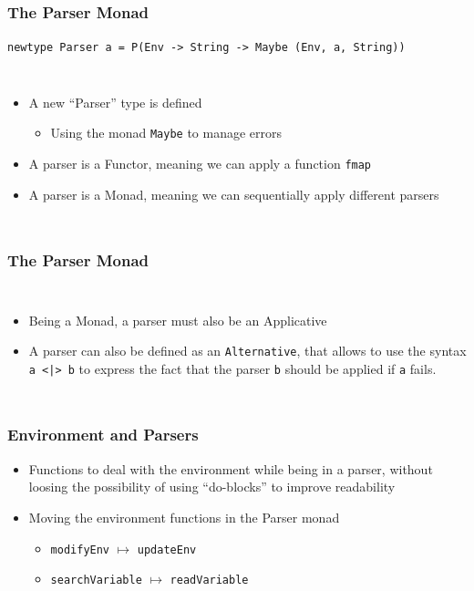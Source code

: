\documentclass{beamer}
\begin{document}
\begin{frame}
	\frametitle{The Parser Monad}
	\begin{center}
		\lstinline{newtype Parser a = P(Env -> String -> Maybe (Env, a, String))}
	\end{center}
	\begin{columns}
		\footnotesize
		\begin{itemize}
			\item A new ``Parser'' type is defined
				\begin{itemize}
					\footnotesize
					\item Using the monad \lstinline|Maybe| to manage errors
				\end{itemize}
			\item A parser is a Functor, meaning we can apply a function
				\texttt{fmap}
			\item A parser is a Monad, meaning we can sequentially apply
				different parsers
		\end{itemize}
		
		
	\end{columns}
\end{frame}

\begin{frame}
	\frametitle{The Parser Monad}
	\begin{columns}
		\column{0.3\textwidth}
		\footnotesize
		\begin{itemize}
			\item Being a Monad, a parser must also be an Applicative
			\item A parser can also be defined as an \texttt{Alternative}, that
				allows to use the syntax \lstinline{a <|> b} to express the
				fact that the parser \texttt{b} should be applied if \texttt{a}
				fails.
		\end{itemize}
		\column{0.65\textwidth}
		
		
	\end{columns}
\end{frame}

\begin{frame}
	\frametitle{Environment and Parsers}
	\begin{itemize}
		\footnotesize
		\item Functions to deal with the environment while being in a parser,
			without loosing the possibility of using ``do-blocks'' to improve
			readability
		\item Moving the environment functions in the Parser monad
			\begin{itemize}
				\item \lstinline{modifyEnv} $\mapsto$ \lstinline{updateEnv}
				\item \lstinline{searchVariable} $\mapsto$ \lstinline{readVariable}
			\end{itemize}
	\end{itemize}
	
	
\end{frame}
\end{document}

